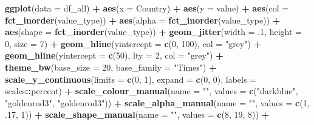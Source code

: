 \documentclass[]{book}
\newenvironment{Shaded}{\begin{snugshade}}{\end{snugshade}}
\newcommand{\KeywordTok}[1]{\textcolor[rgb]{0.13,0.29,0.53}{\textbf{#1}}}
\newcommand{\DataTypeTok}[1]{\textcolor[rgb]{0.13,0.29,0.53}{#1}}
\newcommand{\DecValTok}[1]{\textcolor[rgb]{0.00,0.00,0.81}{#1}}
\newcommand{\StringTok}[1]{\textcolor[rgb]{0.31,0.60,0.02}{#1}}
\newcommand{\OperatorTok}[1]{\textcolor[rgb]{0.81,0.36,0.00}{\textbf{#1}}}
\newcommand{\NormalTok}[1]{#1}
\theoremstyle{definition}
\theoremstyle{definition}
\theoremstyle{definition}
\theoremstyle{remark}
\begin{document}
\begin{Shaded}
\begin{Highlighting}[]
\KeywordTok{ggplot}\NormalTok{(}\DataTypeTok{data =}\NormalTok{ df_all) }\OperatorTok{+}
\StringTok{  }\KeywordTok{aes}\NormalTok{(}\DataTypeTok{x =}\NormalTok{ Country) }\OperatorTok{+}
\StringTok{  }\KeywordTok{aes}\NormalTok{(}\DataTypeTok{y =}\NormalTok{ value) }\OperatorTok{+}
\StringTok{  }\KeywordTok{aes}\NormalTok{(}\DataTypeTok{col =} \KeywordTok{fct_inorder}\NormalTok{(value_type)) }\OperatorTok{+}
\StringTok{  }\KeywordTok{aes}\NormalTok{(}\DataTypeTok{alpha =} \KeywordTok{fct_inorder}\NormalTok{(value_type)) }\OperatorTok{+}
\StringTok{  }\KeywordTok{aes}\NormalTok{(}\DataTypeTok{shape =} \KeywordTok{fct_inorder}\NormalTok{(value_type)) }\OperatorTok{+}
\StringTok{  }\KeywordTok{geom_jitter}\NormalTok{(}\DataTypeTok{width =}\NormalTok{ .}\DecValTok{1}\NormalTok{, }\DataTypeTok{height =} \DecValTok{0}\NormalTok{, }\DataTypeTok{size =} \DecValTok{7}\NormalTok{) }\OperatorTok{+}
\StringTok{  }\KeywordTok{geom_hline}\NormalTok{(}\DataTypeTok{yintercept =} \KeywordTok{c}\NormalTok{(}\DecValTok{0}\NormalTok{, }\DecValTok{100}\NormalTok{), }\DataTypeTok{col =} \StringTok{"grey"}\NormalTok{) }\OperatorTok{+}
\StringTok{  }\KeywordTok{geom_hline}\NormalTok{(}\DataTypeTok{yintercept =} \KeywordTok{c}\NormalTok{(}\DecValTok{50}\NormalTok{), }\DataTypeTok{lty =} \DecValTok{2}\NormalTok{, }\DataTypeTok{col =} \StringTok{"grey"}\NormalTok{) }\OperatorTok{+}
\StringTok{  }\KeywordTok{theme_bw}\NormalTok{(}\DataTypeTok{base_size =} \DecValTok{20}\NormalTok{, }\DataTypeTok{base_family =} \StringTok{"Times"}\NormalTok{) }\OperatorTok{+}
\StringTok{  }\KeywordTok{scale_y_continuous}\NormalTok{(}\DataTypeTok{limits =} \KeywordTok{c}\NormalTok{(}\DecValTok{0}\NormalTok{, }\DecValTok{1}\NormalTok{), }\DataTypeTok{expand =} \KeywordTok{c}\NormalTok{(}\DecValTok{0}\NormalTok{, }\DecValTok{0}\NormalTok{), }\DataTypeTok{labels =}\NormalTok{ scales}\OperatorTok{::}\NormalTok{percent) }\OperatorTok{+}
\StringTok{  }\KeywordTok{scale_colour_manual}\NormalTok{(}\DataTypeTok{name =} \StringTok{""}\NormalTok{, }\DataTypeTok{values =} \KeywordTok{c}\NormalTok{(}\StringTok{"darkblue"}\NormalTok{, }\StringTok{"goldenrod3"}\NormalTok{, }\StringTok{"goldenrod3"}\NormalTok{)) }\OperatorTok{+}
\StringTok{  }\KeywordTok{scale_alpha_manual}\NormalTok{(}\DataTypeTok{name =} \StringTok{""}\NormalTok{, }\DataTypeTok{values =} \KeywordTok{c}\NormalTok{(}\DecValTok{1}\NormalTok{, .}\DecValTok{17}\NormalTok{, }\DecValTok{1}\NormalTok{)) }\OperatorTok{+}
\StringTok{  }\KeywordTok{scale_shape_manual}\NormalTok{(}\DataTypeTok{name =} \StringTok{""}\NormalTok{, }\DataTypeTok{values =} \KeywordTok{c}\NormalTok{(}\DecValTok{8}\NormalTok{, }\DecValTok{19}\NormalTok{, }\DecValTok{8}\NormalTok{)) }\OperatorTok{+}

\end{Highlighting}
\end{Shaded}
\end{document}
